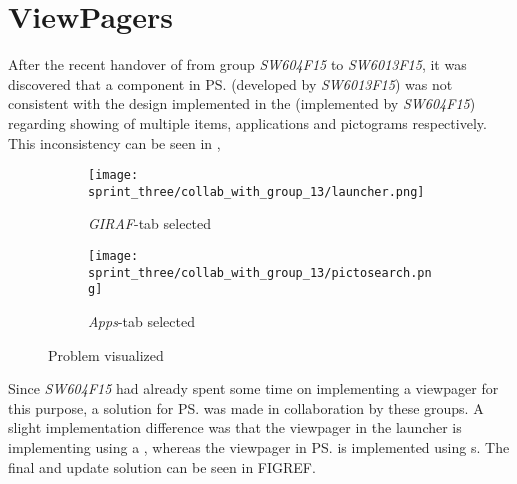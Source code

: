 
\section{ViewPagers} %
\label{sec:viewpagers}


After the recent handover of \gc from group \emph{SW604F15} to \emph{SW6013F15}, it was discovered that a component in \ps (developed by \emph{SW6013F15}) was not consistent with the design implemented in the \launcher (implemented by \emph{SW604F15}) regarding showing of multiple items, applications and pictograms respectively. This inconsistency can be seen in , 

\begin{figure}[!htbp]
    \centering

    \begin{subfigure}[t]{0.4\textwidth}
        \texttt{[image: sprint\_three/collab\_with\_group\_13/launcher.png]}
        \caption{\emph{GIRAF}-tab selected}
        \label{fig:collab_with_group_13_launhcer}
    \end{subfigure}
    \hspace{5em} 
    \begin{subfigure}[t]{0.4\textwidth}
        \texttt{[image: sprint\_three/collab\_with\_group\_13/pictosearch.png]}
        \caption{\emph{Apps}-tab selected}
        \label{fig:collab_with_group_13_pictosearch}
    \end{subfigure}
    
    \caption{Problem visualized}
    \label{fig:collab_with_group_13}
\end{figure}

Since \emph{SW604F15} had already spent some time on implementing a viewpager for this purpose, a solution for \ps was made in collaboration by these groups. A slight implementation difference was that the viewpager in the launcher is implementing using a , whereas the viewpager in \ps is implemented using s. The final and update solution can be seen in FIGREF.

